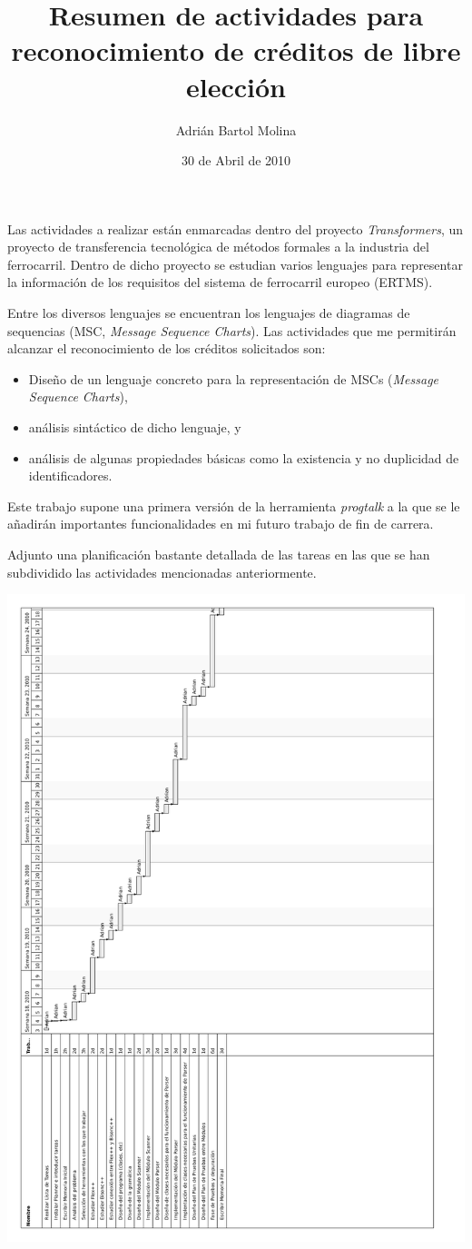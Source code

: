 \documentclass{article}
\title{Resumen de actividades para reconocimiento de créditos de libre elección}
\author{Adrián Bartol Molina}
\date{30 de Abril de 2010}
\begin{document}
\maketitle

Las actividades a realizar están enmarcadas dentro del proyecto
\emph{Transformers}, un proyecto de transferencia tecnológica de
métodos formales a la industria del ferrocarril. Dentro de dicho
proyecto se estudian varios lenguajes para representar la información
de los requisitos del sistema de ferrocarril europeo (ERTMS).

Entre los diversos lenguajes se encuentran los lenguajes de diagramas
de sequencias (MSC, \emph{Message Sequence Charts}). Las actividades
que me permitirán alcanzar el reconocimiento de los créditos
solicitados son:
\begin{itemize}
\item Diseño de un lenguaje concreto para la representación de MSCs (\emph{Message Sequence Charts}),
\item análisis sintáctico de dicho lenguaje, y
\item análisis de algunas propiedades básicas como la existencia y no duplicidad de identificadores.
\end{itemize}

Este trabajo supone una primera versión de la herramienta
\emph{progtalk} a la que se le añadirán importantes funcionalidades en
mi futuro trabajo de fin de carrera.

Adjunto una planificación bastante detallada de las tareas en las
que se han subdividido las actividades mencionadas anteriormente.

\includegraphics[scale=0.8]{plan}
\end{document}
